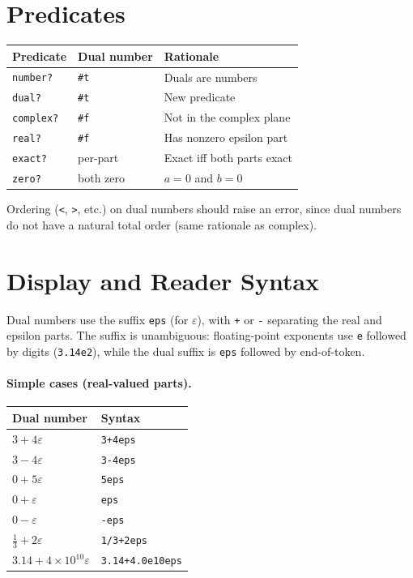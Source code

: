 \documentclass[12pt]{report}
\begin{document}
\section{Predicates}

\begin{center}
\begin{tabular}{lll}
\toprule
Predicate & Dual number & Rationale \\
\midrule
{\tt number?}  & {\tt \#t} & Duals are numbers \\
{\tt dual?}    & {\tt \#t} & New predicate \\
{\tt complex?} & {\tt \#f} & Not in the complex plane \\
{\tt real?}    & {\tt \#f} & Has nonzero epsilon part \\
{\tt exact?}   & per-part  & Exact iff both parts exact \\
{\tt zero?}    & both zero & $a = 0$ and $b = 0$ \\
\bottomrule
\end{tabular}
\end{center}

\noindent Ordering ({\tt <}, {\tt >}, etc.) on dual numbers
should raise an error, since dual numbers do not have a natural
total order (same rationale as complex).

\section{Display and Reader Syntax}

Dual numbers use the suffix {\tt eps} (for $\varepsilon$), with
{\tt +} or {\tt -} separating the real and epsilon parts.  The
suffix is unambiguous: floating-point exponents use {\tt e} followed
by digits ({\tt 3.14e2}), while the dual suffix is {\tt eps}
followed by end-of-token.

\paragraph{Simple cases (real-valued parts).}

\begin{center}
\begin{tabular}{ll}
\toprule
Dual number & Syntax \\
\midrule
$3 + 4\varepsilon$      & {\tt 3+4eps} \\
$3 - 4\varepsilon$      & {\tt 3-4eps} \\
$0 + 5\varepsilon$      & {\tt 5eps} \\
$0 + \varepsilon$       & {\tt eps} \\
$0 - \varepsilon$       & {\tt -eps} \\
$\frac{1}{3} + 2\varepsilon$ & {\tt 1/3+2eps} \\
$3.14 + 4 \times 10^{10}\varepsilon$ & {\tt 3.14+4.0e10eps} \\
\bottomrule
\end{tabular}
\end{center}
\end{document}
